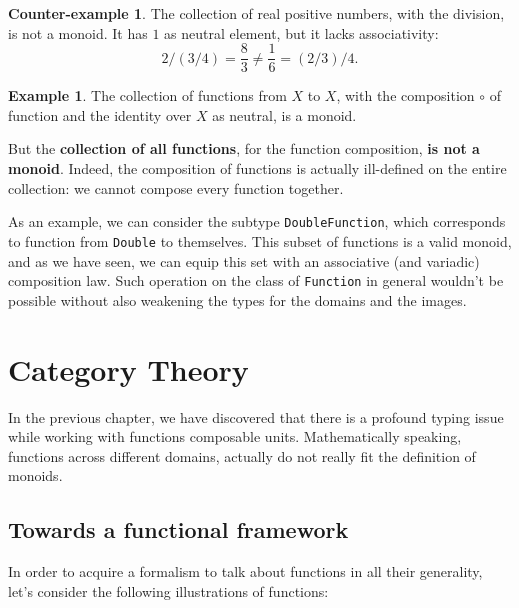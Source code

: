 \documentclass[12pt,a4paper]{report}
\theoremstyle{theorem}
\theoremstyle{definition}
\newtheorem{example}{Example}
\newtheorem{counterexample}{Counter-example}
\begin{document}
\begin{counterexample}
The collection of real positive numbers, with the division, is not a monoid.
It has $1$ as neutral element, but it lacks associativity:
	\[ 2 / (3/4) = \frac{8}{3} \neq \frac{1}{6} = (2/3) / 4 .\]
\end{counterexample}
\begin{example}
The collection of functions from $X$ to $X$, with the composition
$\circ$ of function and the identity over $X$ as neutral,
is a monoid.
\end{example}

But the {\bf collection of all functions}, for the function composition,
{\bf is not a monoid}. Indeed, the composition of functions is actually
ill-defined on the entire collection: we cannot compose every function
together.

As an example, we can consider the subtype
\lstinline{DoubleFunction}{}, which corresponds to function from
\lstinline{Double}{} to themselves. This subset of functions is a valid
monoid, and as we have seen, we can equip this set with an associative
(and variadic) composition law. Such operation on the class of
\lstinline{Function}{} in general wouldn't be possible
without also weakening the types for the domains and the images.

\chapter{Category Theory}

In the previous chapter, we have discovered that there is a profound
typing issue while working with functions composable units.
Mathematically speaking, functions across different domains,
actually do not really fit the definition of monoids.

\section{Towards a functional framework}

In order to acquire a formalism to talk about functions in all their
generality, let's consider the following illustrations of functions:
\end{document}
